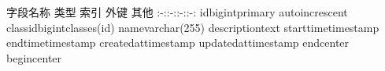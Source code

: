 {}\markdownRendererPipe{} 字段名称 \markdownRendererPipe{} 类型 \markdownRendererPipe{} 索引 \markdownRendererPipe{} 外键 \markdownRendererPipe{} 其他 \markdownRendererPipe{} \markdownRendererPipe{}:-:\markdownRendererPipe{}:-:\markdownRendererPipe{}:-:\markdownRendererPipe{}:-:\markdownRendererPipe{} \markdownRendererPipe{}id\markdownRendererPipe{}bigint\markdownRendererPipe{}primary\markdownRendererPipe{}\markdownRendererPipe{} auto\markdownRendererBackslash{}\markdownRendererUnderscore{}increscent\markdownRendererPipe{} \markdownRendererPipe{}class\markdownRendererBackslash{}\markdownRendererUnderscore{}id\markdownRendererPipe{}bigint\markdownRendererPipe{}\markdownRendererPipe{}classes(id)\markdownRendererPipe{}\markdownRendererPipe{} \markdownRendererPipe{}name\markdownRendererPipe{}varchar(255)\markdownRendererPipe{}\markdownRendererPipe{}\markdownRendererPipe{}\markdownRendererPipe{} \markdownRendererPipe{}description\markdownRendererPipe{}text\markdownRendererPipe{}\markdownRendererPipe{}\markdownRendererPipe{}\markdownRendererPipe{} \markdownRendererPipe{}start\markdownRendererBackslash{}\markdownRendererUnderscore{}time\markdownRendererPipe{}timestamp\markdownRendererPipe{}\markdownRendererPipe{}\markdownRendererPipe{}\markdownRendererPipe{} \markdownRendererPipe{}end\markdownRendererBackslash{}\markdownRendererUnderscore{}time\markdownRendererPipe{}timestamp\markdownRendererPipe{}\markdownRendererPipe{}\markdownRendererPipe{}\markdownRendererPipe{} \markdownRendererPipe{}created\markdownRendererBackslash{}\markdownRendererUnderscore{}at\markdownRendererPipe{}timestamp\markdownRendererPipe{}\markdownRendererPipe{}\markdownRendererPipe{}\markdownRendererPipe{} \markdownRendererPipe{}updated\markdownRendererBackslash{}\markdownRendererUnderscore{}at\markdownRendererPipe{}timestamp\markdownRendererPipe{}\markdownRendererPipe{}\markdownRendererPipe{}\markdownRendererPipe{}\markdownRendererInterblockSeparator
{}\markdownRendererBackslash{}end\markdownRendererLeftBrace{}center\markdownRendererRightBrace{}\markdownRendererInterblockSeparator
{}\markdownRendererInterblockSeparator
{}\markdownRendererBackslash{}begin\markdownRendererLeftBrace{}center\markdownRendererRightBrace{}\markdownRendererInterblockSeparator
